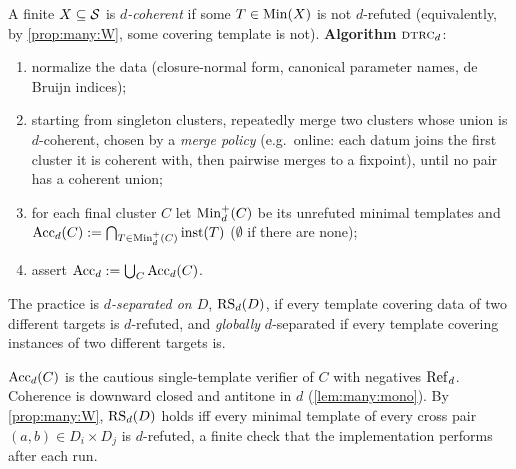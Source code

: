 \begin{definition}\label{def:many:dtrc}
A finite $X\subseteq\mathcal{S}$ is \emph{$d$-coherent} if some $T\in\mathrm{Min}(X)$ is not $d$-refuted (equivalently, by
\cref{prop:many:W}, some covering template is not). \textbf{Algorithm} $\textsc{dtrc}_d$:
\begin{enumerate}[label=(\arabic*),nosep]
\item normalize the data (closure-normal form, canonical parameter names, de Bruijn indices);
\item starting from singleton clusters, repeatedly merge two clusters whose union is $d$-coherent, chosen by a
  \emph{merge policy} (e.g.\ online: each datum joins the first cluster it is coherent with, then pairwise merges to a
  fixpoint), until no pair has a coherent union;
\item for each final cluster $C$ let $\mathrm{Min}^+_d(C)$ be its unrefuted minimal templates and
  $\mathrm{Acc}_d(C):=\bigcap_{T\in\mathrm{Min}^+_d(C)}\mathrm{inst}(T)$ ($\emptyset$ if there are none);
\item assert $\mathrm{Acc}_d:=\bigcup_C\mathrm{Acc}_d(C)$.
\end{enumerate}
The practice is \emph{$d$-separated on $D$}, $\mathrm{RS}_d(D)$, if every template covering data of two different targets is
$d$-refuted, and \emph{globally} $d$-separated if every template covering instances of two different targets is.
\end{definition}

$\mathrm{Acc}_d(C)$ is the cautious single-template verifier of $C$ with negatives $\mathrm{Ref}_d$. Coherence is downward closed and
antitone in $d$ (\cref{lem:many:mono}). By \cref{prop:many:W}, $\mathrm{RS}_d(D)$ holds iff every minimal template of every cross
pair $(a,b)\in D_i\times D_j$ is $d$-refuted, a finite check that the implementation performs after each run.

